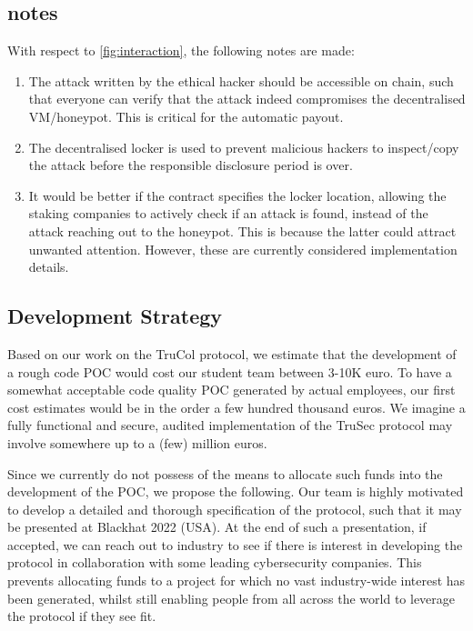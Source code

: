 \subsection{ notes}
With respect to \cref{fig:interaction}, the following notes are made:
\begin{enumerate} 
    \item The attack written by the ethical hacker should be accessible on chain, such that everyone can verify that the attack indeed compromises the decentralised VM/honeypot. This is critical for the automatic payout.
    \item The decentralised locker is used to prevent malicious hackers to inspect/copy the attack before the responsible disclosure period is over.
    \item It would be better if the contract specifies the locker location, allowing the staking companies to actively check if an attack is found, instead of the attack reaching out to the honeypot. This is because the latter could attract unwanted attention. However, these are currently considered implementation details.
\end{enumerate}


\subsection{Development Strategy}
Based on our work on the TruCol protocol, we estimate that the development of a rough code POC would cost our student team between 3-10K euro. To have a somewhat acceptable code quality POC generated by actual employees, our first cost estimates would be in the order a few hundred thousand euros. We imagine a fully functional and secure, audited implementation of the TruSec protocol may involve somewhere up to a (few) million euros. 

Since we currently do not possess of the means to allocate such funds into the development of the POC, we propose the following. Our team is highly motivated to develop a detailed and thorough specification of the protocol, such that it may be presented at Blackhat 2022 (USA). At the end of such a presentation, if accepted, we can reach out to industry to see if there is interest in developing the protocol in collaboration with some leading cybersecurity companies. This prevents allocating funds to a project for which no vast industry-wide interest has been generated, whilst still enabling people from all across the world to leverage the protocol if they see fit.